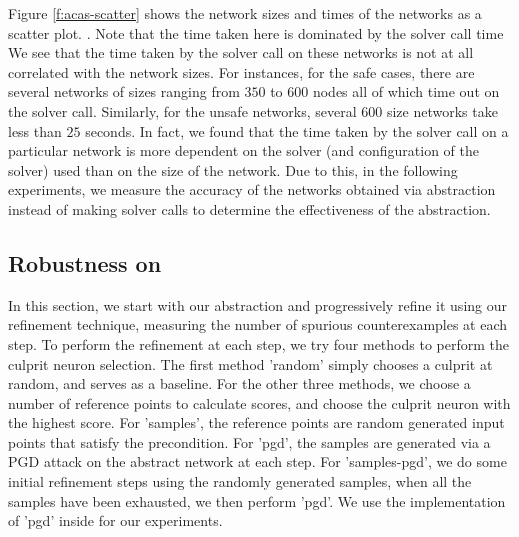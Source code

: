 Figure \ref{f:acas-scatter} shows the network sizes and times of the \acasxu
networks as a scatter plot. . Note that the
time taken here is dominated by the solver call time  We see that the time taken by the solver call on
these networks is not at all correlated with the network sizes. For instances,
for the safe cases, there are several networks of sizes ranging from $350$ to
$600$ \relu nodes all of which time out on the solver call. Similarly, for the
unsafe networks, several $600$ size networks take less than $25$ seconds. In
fact, we found that the time taken by the solver call on a particular network is
more dependent on the solver (and configuration of the solver) used than on the
size of the network. Due to this, in the following experiments, we measure the
accuracy of the networks obtained via abstraction instead of making solver calls
to determine the effectiveness of the abstraction. 

\subsection{Robustness on \mnist}

In this section, we start with our abstraction and progressively refine it using
our refinement technique, measuring the number of spurious counterexamples at
each step. To perform the refinement at each step, we try four methods to
perform the culprit neuron selection. The first method 'random' simply chooses a
culprit at random, and serves as a baseline. For the other three methods, we
choose a number of reference points to calculate scores, and choose the culprit
neuron with the highest score. For 'samples', the reference points are random
generated input points that satisfy the precondition. For 'pgd', the samples are
generated via a PGD  attack on the abstract network at each step. For
'samples-pgd', we do some initial refinement steps using the randomly generated
samples, when all the samples have been exhausted, we then perform 'pgd'. We use
the implementation of 'pgd' inside \abcrown for our experiments.

